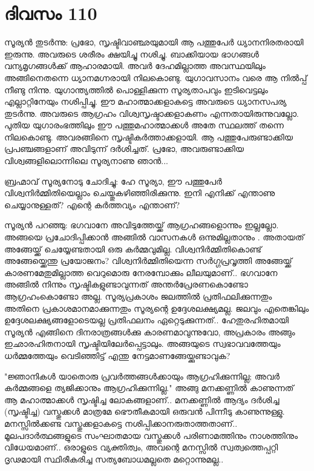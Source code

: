  
\section{ദിവസം 110}


സൂര്യന്‍ തുടര്‍ന്നു: പ്രഭോ,  സൃഷ്ടിവാഞ്ഛയുമായി ആ പത്തുപേര്‍ ധ്യാനനിരതരായി ഇരുന്നു. അവരുടെ ശരീരം ക്ഷയിച്ചു നശിച്ചു. ബാക്കിയായ ഭാഗങ്ങള്‍ വന്യമൃഗങ്ങള്‍ക്ക്‌ ആഹാരമായി. അവര്‍ ദേഹമില്ലാത്ത അവസ്ഥയിലും അങ്ങിനെതന്നെ ധ്യാനമഗ്നരായി നിലകൊണ്ടു.  യുഗാവസാനം വരെ  ആ നില്‍പ്പ്‌ നീണ്ടു നിന്നു. യുഗാന്ത്യത്തില്‍ പൊള്ളിക്കുന്ന സൂര്യതാപവും ഇടിവെട്ടലും എല്ലാറ്റിനേയും നശിപ്പിച്ചു. ഈ മഹാത്മാക്കളാകട്ടെ അവരുടെ ധ്യാനസപര്യ തുടര്‍ന്നു. അവരുടെ ആഗ്രഹം വിശ്വസൃഷ്ടാക്കളാകണം എന്നതായിരുന്നുവല്ലോ. പുതിയ യുഗാരംഭത്തിലും ഈ പത്തുമഹാത്മാക്കള്‍ അതേ സ്ഥലത്ത്‌ തന്നെ നിലകൊണ്ടു. അവരങ്ങിനെ സൃഷ്ടികര്‍ത്താക്കളായി. ആ പത്തുപേരുണ്ടാക്കിയ പ്രപഞ്ചങ്ങളാണ്‌ അവിടുന്ന് ദര്‍ശിച്ചത്‌. പ്രഭോ, അവരുണ്ടാക്കിയ വിശ്വങ്ങളിലൊന്നിലെ സൂര്യനാണു ഞാന്‍...

ബ്രഹ്മാവ്‌ സൂര്യനോടു ചോദിച്ചു: ഹേ സൂര്യാ, ഈ പത്തുപേര്‍ വിശ്വനിര്‍മ്മിതിയെല്ലാം ചെയ്തുകഴിഞ്ഞിരിക്കുന്നു. ഇനി എനിക്ക്‌ എന്താണു ചെയ്യാനുള്ളത്‌? എന്റെ കര്‍ത്തവ്യം എന്താണ്‌?

സൂര്യന്‍ പറഞ്ഞു: ഭഗവാനേ അവിടുത്തേയ്ക്ക്‌ ആഗ്രഹങ്ങളൊന്നും ഇല്ലല്ലോ. അങ്ങയെ പ്രചോദിപ്പിക്കാന്‍  അങ്ങില്‍ വാസനകള്‍ ഒന്നുമില്ലതാനും . അതായത്‌ അങ്ങേയ്ക്ക്‌ ചെയ്യേണ്ടതായി ഒരു കര്‍മ്മവുമില്ല. വിശ്വനിര്‍മ്മിതികൊണ്ട്‌ അങ്ങേയ്ക്കെന്തു പ്രയോജനം? വിശ്വനിര്‍മ്മിതിയെന്ന സര്‍ഗ്ഗപ്രവൃത്തി അങ്ങേയ്ക്ക്‌ കാരണമേതുമില്ലാത്ത വെറുമൊരു നേരമ്പോക്കും ലീലയുമാണ്‌.. ഭഗവാനേ അങ്ങില്‍ നിന്നും സൃഷ്ടികളുണ്ടാവുന്നത്‌ അന്തര്‍പ്രേരണകൊണ്ടോ ആഗ്രഹംകൊണ്ടോ അല്ല. സൂര്യപ്രകാശം ജലത്തില്‍ പ്രതിഫലിക്കുന്നതും അതിനെ പ്രകാശമാനമാക്കുന്നതും സൂര്യന്റെ ഉദ്ദേശലക്ഷ്യമല്ല. ജലവും എതെങ്കിലും ഉദ്ദേശലക്ഷ്യങ്ങളോടെയല്ല പ്രതിഫലനം ഏറ്റെടുക്കുന്നത്‌.. ഹേതുരഹിതമായി സൂര്യന്‍ എങ്ങിനെ ദിനരാത്രങ്ങള്‍ക്കു കാരണമാവുന്നുവോ, അപ്രകാരം അങ്ങും ഇഛാരഹിതനായി സൃഷ്ടിയിലേര്‍പ്പെട്ടാലും. അങ്ങയുടെ സ്വഭാവവത്തേയും ധര്‍മ്മത്തേയും വെടിഞ്ഞിട്ട്‌ എന്തു നേട്ടമാണങ്ങേയ്ക്കുണ്ടാവുക?

"ജ്ഞാനികള്‍ യാതൊരു പ്രവര്‍ത്തങ്ങള്‍ക്കായും ആഗ്രഹിക്കുന്നില്ല; അവര്‍ കര്‍മ്മങ്ങളെ ത്യജിക്കാനും ആഗ്രഹിക്കുന്നില്ല." അങ്ങു മനക്കണ്ണില്‍ കാണുന്നത്‌ ആ മഹാത്മാക്കള്‍ സൃഷ്ടിച്ച ലോകങ്ങളാണ്‌.. മനക്കണ്ണില്‍ ആദ്യം ദര്‍ശിച്ച (സൃഷ്ടിച്ച) വസ്തുക്കള്‍ മാത്രമേ ഭൌതീകമായി ഒരുവന്‍ പിന്നീടു കാണുന്നുള്ളു. മനസ്സില്‍ക്കണ്ട വസ്തുക്കളാകട്ടെ നശിപ്പിക്കാനരുതാത്തതാണ്‌.. മൂലപദാര്‍ത്ഥങ്ങളുടെ സംഘാതമായ വസ്തുക്കള്‍ പരിണാമത്തിനും നാശത്തിനും വിധേയമാണ്‌.. ഒരാളുടെ വ്യക്തിത്വം, അവന്റെ മനസ്സില്‍ സ്വത്വത്തെപ്പറ്റി ദൃഢമായി സ്ഥിരീകരിച്ച സത്യബോധമല്ലതെ മറ്റൊന്നുമല്ല..

